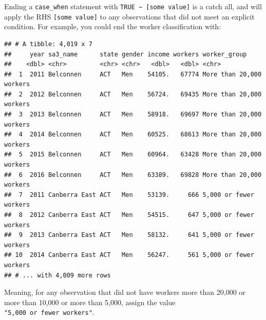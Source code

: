 \documentclass[]{book}
\newenvironment{Shaded}{\begin{snugshade}}{\end{snugshade}}
\newcommand{\DataTypeTok}[1]{\textcolor[rgb]{0.13,0.29,0.53}{#1}}
\newcommand{\DecValTok}[1]{\textcolor[rgb]{0.00,0.00,0.81}{#1}}
\newcommand{\KeywordTok}[1]{\textcolor[rgb]{0.13,0.29,0.53}{\textbf{#1}}}
\newcommand{\NormalTok}[1]{#1}
\newcommand{\OperatorTok}[1]{\textcolor[rgb]{0.81,0.36,0.00}{\textbf{#1}}}
\newcommand{\OtherTok}[1]{\textcolor[rgb]{0.56,0.35,0.01}{#1}}
\newcommand{\StringTok}[1]{\textcolor[rgb]{0.31,0.60,0.02}{#1}}
\begin{document}
Ending a \texttt{case\_when} statement with \texttt{TRUE\ \textasciitilde{}\ {[}some\ value{]}} is a catch all, and will apply the RHS \texttt{{[}some\ value{]}} to any observations that did not meet an explicit condition. For example, you could end the worker classification with:

\begin{Shaded}
\end{Shaded}

\begin{verbatim}
## # A tibble: 4,019 x 7
##     year sa3_name      state gender income workers worker_group            
##    <dbl> <chr>         <chr> <chr>   <dbl>   <dbl> <chr>                   
##  1  2011 Belconnen     ACT   Men    54105.   67774 More than 20,000 workers
##  2  2012 Belconnen     ACT   Men    56724.   69435 More than 20,000 workers
##  3  2013 Belconnen     ACT   Men    58918.   69697 More than 20,000 workers
##  4  2014 Belconnen     ACT   Men    60525.   68613 More than 20,000 workers
##  5  2015 Belconnen     ACT   Men    60964.   63428 More than 20,000 workers
##  6  2016 Belconnen     ACT   Men    63389.   69828 More than 20,000 workers
##  7  2011 Canberra East ACT   Men    53139.     666 5,000 or fewer workers  
##  8  2012 Canberra East ACT   Men    54515.     647 5,000 or fewer workers  
##  9  2013 Canberra East ACT   Men    58132.     641 5,000 or fewer workers  
## 10  2014 Canberra East ACT   Men    56247.     561 5,000 or fewer workers  
## # ... with 4,009 more rows
\end{verbatim}

Meaning, for any observation that did not have workers more than 20,000 or more than 10,000 or more than 5,000, assign the value \texttt{"5,000\ or\ fewer\ workers"}.
\end{document}
